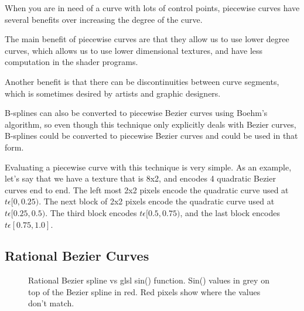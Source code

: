 \documentclass{jcgt}
\begin{document}
When you are in need of a curve with lots of control points, piecewise curves have several benefits over increasing the degree of the curve.

The main benefit of piecewise curves are that they allow us to use lower degree curves, which allows us to use lower dimensional textures, and have less computation in the shader programs.

Another benefit is that there can be discontinuities between curve segments, which is sometimes desired by artists and graphic designers.

B-splines can also be converted to piecewise Bezier curves using Boehm's algorithm, so even though this technique only explicitly deals with Bezier curves, B-splines could be converted to piecewise Bezier curves and could be used in that form.

Evaluating a piecewise curve with this technique is very simple.  As an example, let's say that we have a texture that is 8x2, and encodes 4 quadratic Bezier curves end to end. The left most 2x2 pixels encode the quadratic curve used at $t \epsilon [0,0.25)$.  The next block of 2x2 pixels encode the quadratic curve used at $t \epsilon [0.25,0.5)$.  The third block encodes $t \epsilon [0.5,0.75)$, and the last block encodes $t \epsilon [0.75,1.0]$.

\subsection{Rational Bezier Curves}

\begin{figure}

    \caption{Rational Bezier spline vs glsl sin() function.  Sin() values in grey on top of the Bezier spline in red.  Red pixels show where the values don't match. }
    \label{fig:rationalbeziersincos}
  \end{figure}
\end{document}

